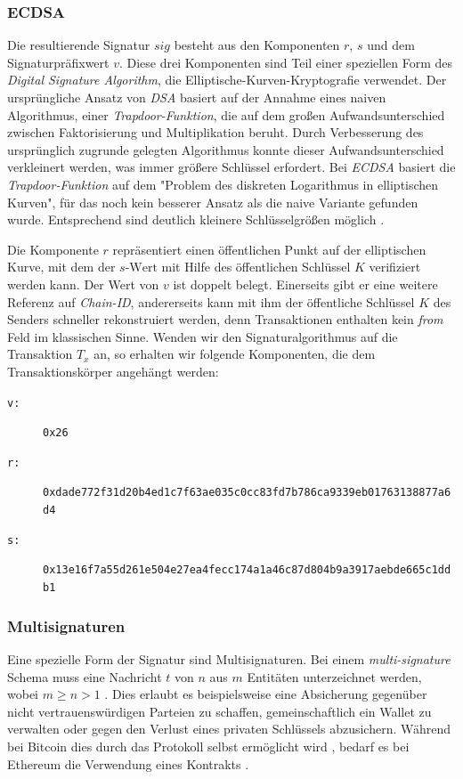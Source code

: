 \documentclass[runningheads]{llncs}
\begin{document}
\subsubsection{ECDSA}
\label{ecdsa}
Die resultierende Signatur $ sig $ besteht aus den Komponenten $ r $, $ s $ und dem Signaturpräfixwert $ v $.  Diese drei Komponenten sind Teil einer speziellen Form des \textit{Digital Signature Algorithm}, die Elliptische-Kurven-Kryptografie verwendet. Der ursprüngliche Ansatz von \textit{DSA} basiert auf der Annahme eines naiven Algorithmus, einer \textit{Trapdoor-Funktion}, die auf dem großen Aufwandsunterschied zwischen Faktorisierung und Multiplikation beruht. Durch Verbesserung des ursprünglich zugrunde gelegten Algorithmus konnte dieser Aufwandsunterschied verkleinert werden, was immer größere Schlüssel erfordert. Bei \textit{ECDSA} basiert die \textit{Trapdoor-Funktion} auf dem "Problem des diskreten Logarithmus in elliptischen Kurven", für das noch kein besserer Ansatz als die naive Variante gefunden wurde. Entsprechend sind deutlich kleinere Schlüsselgrößen möglich \cite{noauthor_elliptic_2020}.

Die Komponente $ r $ repräsentiert einen öffentlichen Punkt auf der elliptischen Kurve, mit dem der $ s\text{-Wert} $ mit Hilfe des öffentlichen Schlüssel $ K $ verifiziert werden kann. Der Wert von $ v $ ist doppelt belegt. Einerseits gibt er eine weitere Referenz auf \textit{Chain-ID}, andererseits kann mit ihm der öffentliche Schlüssel $ K $ des Senders schneller rekonstruiert werden, denn Transaktionen enthalten kein \textit{from} Feld im klassischen Sinne. Wenden wir den Signaturalgorithmus auf die Transaktion $ T_x $ an, so erhalten wir folgende Komponenten, die dem Transaktionskörper angehängt werden: \cite[S. 114 ff.]{antonopoulos_mastering_2019}

\begin{small}
  \begin{description}
    \item[\texttt{v:}] \texttt{0x26}
    \item [\texttt{r:}] \texttt{0xdade772f31d20b4ed1c7f63ae035c0cc83fd7b786ca9339eb01763138877a6d4}
    \item[\texttt{s:}] \texttt{0x13e16f7a55d261e504e27ea4fecc174a1a46c87d804b9a3917aebde665c1ddb1}
\end{description}
\end{small}
\subsubsection{Multisignaturen}
Eine spezielle Form der Signatur sind Multisignaturen. Bei einem \textit{multi-signature} Schema muss eine Nachricht $ t $ von $ n $ aus $ m $ Entitäten unterzeichnet werden, wobei $ m \geq n > 1 $ \cite[S. 2]{hutchison_identity-based_2006}. Dies erlaubt es beispielsweise eine Absicherung gegenüber nicht vertrauenswürdigen Parteien zu schaffen, gemeinschaftlich ein Wallet zu verwalten oder gegen den Verlust eines privaten Schlüssels abzusichern. Während bei Bitcoin dies durch das Protokoll selbst ermöglicht wird \cite{noauthor_multisignature_nodate}, bedarf es bei Ethereum die Verwendung eines Kontrakts \cite{noauthor_frequently_nodate}.
\end{document}
